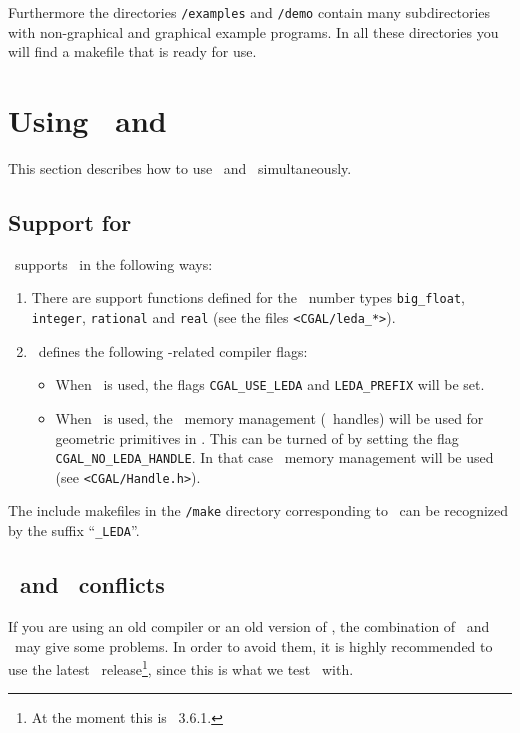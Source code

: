 Furthermore the directories \texttt{\cgaldir/examples} and
\texttt{\cgaldir/demo} contain many subdirectories with non-graphical
and graphical example programs.  In all these directories you will
find a makefile that is ready for use.

\section{Using \cgal\ and \leda \label{sec:leda}}
This section describes how to use \cgal\ and \leda\ simultaneously.

\subsection{Support for \leda}
\cgal\ supports \leda\ in the following ways:

\begin{enumerate}
\item There are support functions defined for the \leda\ number types
  \texttt{big\_float}, \texttt{integer}, \texttt{rational} and
  \texttt{real} (see the files \texttt{<CGAL/leda\_*>}).

\item
\cgal\ defines the following \leda-related compiler flags:
\begin{itemize}
\item When \leda\ is used, the flags \texttt{CGAL\_USE\_LEDA} and
  \texttt{LEDA\_PREFIX} will be set.
\item When \leda\ is used, the \leda\ memory management (\leda\ handles) will be
used for geometric primitives in \cgal. This can be turned of by setting the flag
\texttt{CGAL\_NO\_LEDA\_HANDLE}. In that case \cgal\ memory management will
be used (see \texttt{<CGAL/Handle.h>}).
\end{itemize}
\end{enumerate}

The include makefiles in the \texttt{\cgaldir/make} directory
corresponding to \leda\ can be recognized by the suffix
``\texttt{\_LEDA}''.

\subsection{\leda\ and \stl\ conflicts}

If you are using an old compiler or an old version of \stl, the
combination of \leda\ and \stl\ may give some problems. In order to
avoid them, it is highly recommended to use the latest \leda\ 
release\footnote{At the moment this is \leda\ 3.6.1.}, since this is
what we test \cgal\ with.

